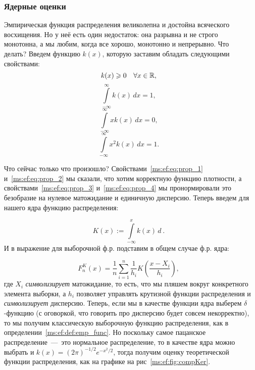 \documentclass[../TV&MS.tex]{subfiles}
\begin{document}
\subsubsection{Ядерные оценки}

Эмпирическая функция распределения великолепна и достойна всяческого восхищения.
Но у неё есть один недостаток: она разрывна и не строго монотонна, а мы любим, когда все хорошо, монотонно и непрерывно. 
Что делать?
Введем функцию $k(x)$, которую заставим обладать следующими свойствами:
\begin{equation}\label{ms:ef:eq:prop_1}
    k(x) \geqslant 0 \quad \forall x \in \mathbb{R},
\end{equation}
\begin{equation}\label{ms:ef:eq:prop_2}
    \int\limits_{-\infty}^{\infty} k(x)\,dx = 1,
\end{equation}
\begin{equation}\label{ms:ef:eq:prop_3}
    \int\limits_{-\infty}^{\infty} xk(x)\,dx = 0,
\end{equation} 
\begin{equation}\label{ms:ef:eq:prop_4}
    \int\limits_{-\infty}^{\infty} x^2k(x)\,dx = 1
.\end{equation} 

Что сейчас только что произошло? 
Свойствами~\eqref{ms:ef:eq:prop_1} и~\eqref{ms:ef:eq:prop_2}
мы сказали, что хотим корректную функцию плотности,
а свойствами~\eqref{ms:ef:eq:prop_3} и~\eqref{ms:ef:eq:prop_4}
мы пронормировали это безобразие на нулевое матожидание и единичную дисперсию.
Теперь введем для нашего ядра функцию распределения:

\begin{equation}
    K(x) := \int\limits_{-\infty}^{x} k(x)\,d~
.\end{equation}
И в выражение для выборочной ф.р. подставим в общем случае ф.р. ядра:

\begin{equation}
    F_{n}^{K}(x) = \frac{1}{n}\sum\limits_{i=1}^{n} \frac{1}{h_i} K\left(\frac{x - X_{i}}{h_i}\right)
,\end{equation} 
где $X_i$ \textit{символизирует} матожидание, то есть, что мы пляшем вокруг
конкретного элемента выборки, а $h_i$ позволяет управлять крутизной
функции распределения и \textit{символизирует} дисперсию.
Теперь, если мы в качестве функции ядра выберем $\delta$-функцию
(с оговоркой, что говорить про дисперсию будет совсем некорректно), 
то мы получим классическую выборочную функцию распределения,
как в определении~\ref{ms:ef:def:emp_func}.
Но поскольку самое пацанское распределение~---~это нормальное распределение,
то в качестве ядра можно выбрать и $k(x) = (2\pi)^{-1\!/2}e^{-x^2\!/2}$, тогда получим
оценку теоретической функции распределения, как на графике на рис~\ref{ms:ef:fig:compKer}. 
\end{document}
